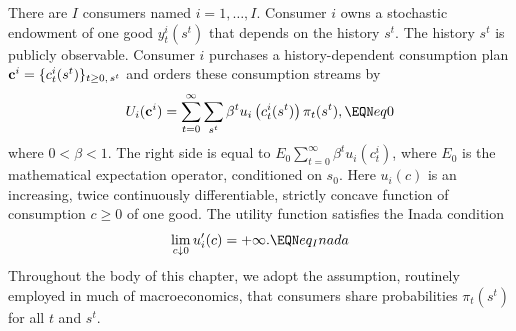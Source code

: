 There are $I$ consumers named $i=1, \ldots , I$. Consumer $i$
owns a stochastic endowment of one good
$y_t^i(s^t)$ that depends on the
history $s^t$.
The history $s^t$ is publicly observable.
Consumer $i$
purchases a history-dependent  consumption plan ${\bf c}^i =
 \{c_t^i(s^t)\}_{t\geq0,\,s^t}$ and
orders these
consumption streams by
%
%
$$ U_i({\bf c}^i) =
  \sum_{t=0}^\infty \sum_{s^t} \beta^t u_i\left(c_t^i(s^t)\right)
   \pi_t(s^t),
 \EQN eq0 $$
 where $0 < \beta < 1$.
The right side is equal to $ E_0 \sum_{t=0}^\infty \beta^t
u_i(c_t^i) $, where $E_0$ is the mathematical expectation operator,
conditioned on $s_0$. Here $u_i(c)$ is an increasing, twice
continuously differentiable, strictly concave function of
consumption $c\geq 0$  of one good. The utility function satisfies
the Inada condition
$$ \lim_{c \downarrow 0} u'_i(c) = +\infty.  \EQN eq_Inada $$
Throughout the body  of this chapter, we adopt the assumption, routinely
employed in much of macroeconomics,
that  consumers share   probabilities $\pi_t(s^t)$ for all $t$ and $s^t$.

